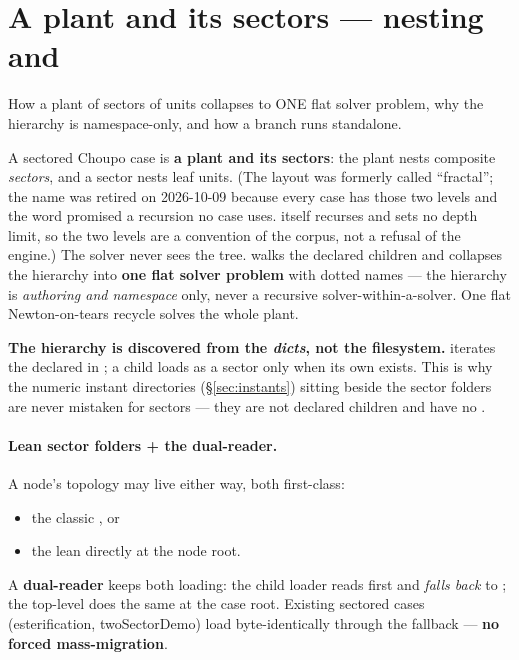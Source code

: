 \documentclass[11pt,a4paper]{article}
\begin{document}
\section{A plant and its sectors --- nesting and }
\label{sec:sectors}

\begin{whatyoulllearn}
How a plant of sectors of units collapses to ONE flat solver problem, why the
hierarchy is namespace-only, and how a branch runs standalone.
\end{whatyoulllearn}

A sectored Choupo case is \textbf{a plant and its sectors}: the plant nests
composite \emph{sectors}, and a sector nests leaf units.  (The layout was
formerly called ``fractal''; the name was retired on 2026-10-09 because every
case has those two levels and the word promised a recursion no case uses.
 itself recurses and sets no depth limit, so the two levels
are a convention of the corpus, not a refusal of the engine.)  The solver
never sees the tree.
 walks the declared children and collapses the hierarchy into
\textbf{one flat solver problem} with dotted  names ---
the hierarchy is \emph{authoring and namespace} only, never a recursive
solver-within-a-solver.  One flat Newton-on-tears recycle solves the whole
plant.

\begin{keyidea}
\textbf{The hierarchy is discovered from the \emph{dicts}, not the filesystem.}
 iterates the  declared in
; a child loads as a sector only when its own
 exists.  This is why the numeric instant directories
(\S\ref{sec:instants}) sitting beside the sector folders are never mistaken for
sectors --- they are not declared children and have no .
\end{keyidea}

\paragraph{Lean sector folders + the dual-reader.}  A node's topology may live
either way, both first-class:
\begin{itemize}[leftmargin=*,nosep]
  \item the classic , or
  \item the lean  directly at the node root.
\end{itemize}
A \textbf{dual-reader} keeps both loading: the child loader reads
 first and \emph{falls back} to
; the top-level  does the
same at the case root.  Existing sectored cases (esterification, twoSectorDemo)
load byte-identically through the fallback --- \textbf{no forced mass-migration}.
\end{document}
